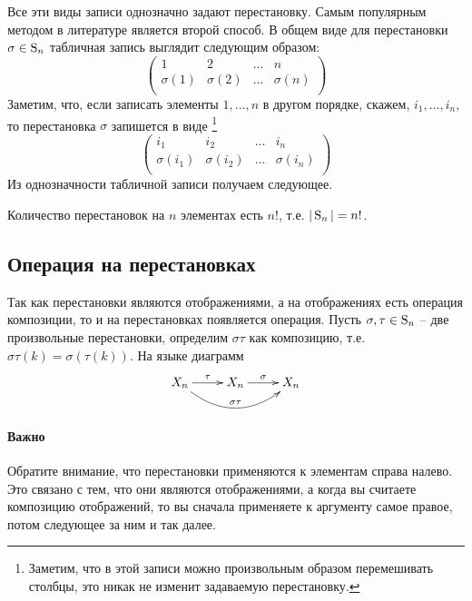 Все эти виды записи однозначно задают перестановку.
Самым популярным методом в литературе является второй способ.
В общем виде для перестановки $\sigma\in\operatorname{S}_{n}$ табличная запись выглядит следующим образом:
\[
\begin{pmatrix}
{1}&{2}&{\ldots}&{n}\\
{\sigma(1)}&{\sigma(2)}&{\ldots}&{\sigma(n)}\\
\end{pmatrix}
\]
Заметим, что, если записать элементы $1,\ldots,n$ в другом порядке, скажем, $i_1,\ldots,i_n$, то перестановка $\sigma$ запишется в виде%
\footnote{Заметим, что в этой записи можно произвольным образом перемешивать столбцы, это никак не изменит задаваемую перестановку.}
\[
\begin{pmatrix}
{i_1}&{i_2}&{\ldots}&{i_n}\\
{\sigma(i_1)}&{\sigma(i_2)}&{\ldots}&{\sigma(i_n)}\\
\end{pmatrix}
\]
Из однозначности табличной записи получаем следующее.
\begin{claim*}
Количество перестановок на $n$ элементах есть $n!$, т.е. $|\operatorname{S}_{n}| = n!$.
\end{claim*}


\subsection{Операция на перестановках}

Так как перестановки являются отображениями, а на отображениях есть операция композиции, то и на перестановках появляется операция.
Пусть $\sigma,\tau\in\operatorname{S}_{n}$ -- две произвольные перестановки, определим $\sigma \tau$ как композицию, т.е. $\sigma\tau(k) = \sigma(\tau(k))$.
На языке диаграмм
\[
\xymatrix{
	{X_n}\ar[r]^{\tau}\ar@/_20pt/[rr]^{\sigma\tau}&{X_n}\ar[r]^{\sigma}&{X_n}
}
\]

\paragraph{Важно}

Обратите внимание, что перестановки применяются к элементам справа налево.
Это связано с тем, что они являются отображениями, а когда вы считаете композицию отображений, то вы сначала применяете к аргументу самое правое, потом следующее за ним и так далее.


